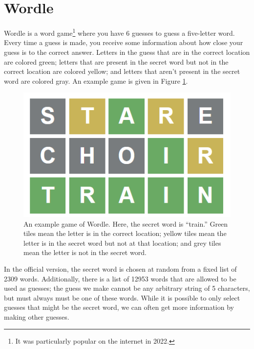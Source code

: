 \labdependencies{}

\section*{Wordle}
Wordle is a word game\footnote{It was particularly popular on the internet in 2022.} where you have 6 guesses to guess a five-letter word.
Every time a guess is made, you receive some information about how close your guess is to the correct answer.
Letters in the guess that are in the correct location are colored green; letters that are present in the secret word but not in the correct location are colored yellow; and letters that aren't present in the secret word are colored gray.
An example game is given in Figure \ref{fig:wordle-example}.

\begin{figure}[H]
	\includegraphics{figures/wordle-example.png}
	\caption{
	\label{fig:wordle-example}
	An example game of Wordle.
	Here, the secret word is ``train.''
	Green tiles mean the letter is in the correct location; yellow tiles mean the letter is in the secret word but not at that location; and grey tiles mean the letter is not in the secret word.
	}
\end{figure}

In the official version, the secret word is chosen at random from a fixed list of 2309 words.
Additionally, there is a list of 12953 words that are allowed to be used as guesses; the guess we make cannot be any arbitrary string of 5 characters, but must always must be one of these words.
While it is possible to only select guesses that might be the secret word, we can often get more information by making other guesses.

